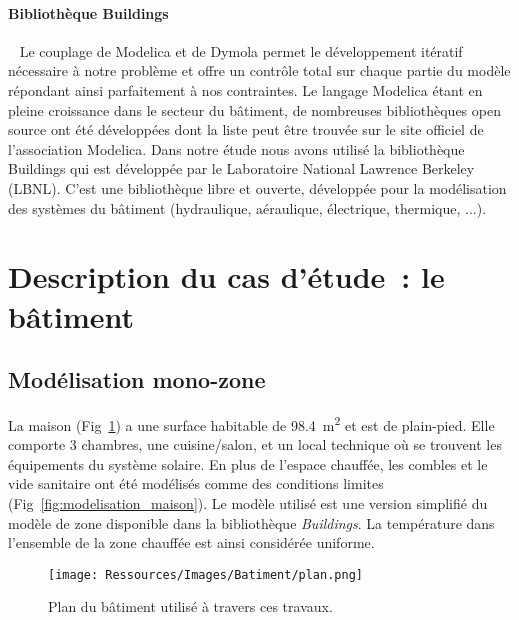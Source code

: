 \paragraph{Bibliothèque Buildings} %
\label{par:bibliotheque_buildings}
~
Le couplage de Modelica et de Dymola permet le développement itératif nécessaire à notre
problème et offre un contrôle total sur chaque partie du modèle répondant ainsi
parfaitement à nos contraintes. Le langage Modelica étant en pleine croissance dans le
secteur du bâtiment, de nombreuses bibliothèques open source ont été développées dont la
liste peut être trouvée sur le site officiel de l’association Modelica. Dans notre étude
nous avons utilisé la bibliothèque Buildings qui est développée par le Laboratoire
National Lawrence Berkeley (LBNL). C’est une bibliothèque libre et ouverte, développée
pour la modélisation des systèmes du bâtiment (hydraulique, aéraulique, électrique,
thermique, ...).





\section{Description du cas d’étude~: le bâtiment} %
\label{sec:description_du_cas_d_etude_le_batiment}
\subsection{Modélisation mono-zone} %
\label{sub:modelisation_monozone}
La maison (Fig~\ref{fig:plan_maison}) a une surface habitable de \SI{98.4}{\meter\squared}
et est de plain-pied.
Elle comporte 3 chambres, une cuisine/salon, et un local technique où se
trouvent les équipements du système solaire.
En plus de l’espace chauffée, les combles et le vide sanitaire ont été modélisés
comme des conditions limites (Fig~\ref{fig:modelisation_maison}). Le modèle utilisé est une version
simplifié du modèle de zone disponible dans la bibliothèque \textit{Buildings}.
La température dans l’ensemble de la zone chauffée est ainsi considérée uniforme.
\begin{figure}
    \begin{center}
        \texttt{[image: Ressources/Images/Batiment/plan.png]}
    \end{center}
    \caption{Plan du bâtiment utilisé à travers ces travaux.
             \label{fig:plan_maison}}
\end{figure}

